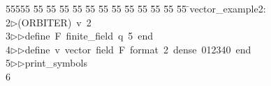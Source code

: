 %
%
\begin{tabbing}
55555 \= 55 \= 55 \= 55 \= 55 \= 55 \= 55 \= 55 \= 55 \= 55 \= 55 \= 55 \= 55 \= \>vector\_example2:\\[0pt]
2\>$\triangleright$\>(ORBITER)\ v\ 2\ \\[0pt]
3\>$\triangleright$\>$\triangleright$\>define\ F\ finite\_field\ q\ 5\ end\ \\[0pt]
4\>$\triangleright$\>$\triangleright$\>define\ v\ vector\ field\ F\ format\ 2\ dense\ 012340\ end\ \\[0pt]
5\>$\triangleright$\>$\triangleright$\>print\_symbols\\[0pt]
6\>\end{tabbing}
